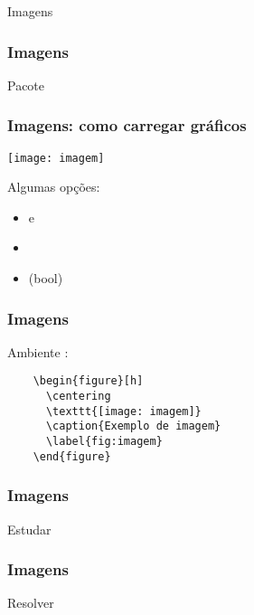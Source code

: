 \begin{frame}[standout]
  \Huge
  Imagens
\end{frame}

\begin{frame}
  \frametitle{Imagens}
  \LARGE
  Pacote 
\end{frame}

\begin{frame}[fragile]
  \frametitle{Imagens: como carregar gráficos}
  \Large
  \texttt{\texttt{[image: imagem]}}
  \vspace{1em}

  Algumas opções:
  \begin{itemize}
    \item {} e 
    \item {}
    \item {} (bool)
  \end{itemize}
\end{frame}

\begin{frame}[fragile]
  \frametitle{Imagens}
  \Large
  Ambiente :

    \begin{verbatim}
    \begin{figure}[h]
      \centering
      \texttt{[image: imagem]}
      \caption{Exemplo de imagem}
      \label{fig:imagem}
    \end{figure}
    \end{verbatim}
\end{frame}

\begin{frame}
  \frametitle{Imagens}
  \Huge
  Estudar 
\end{frame}

\begin{frame}
  \frametitle{Imagens}
  \Huge
  Resolver 
\end{frame}

